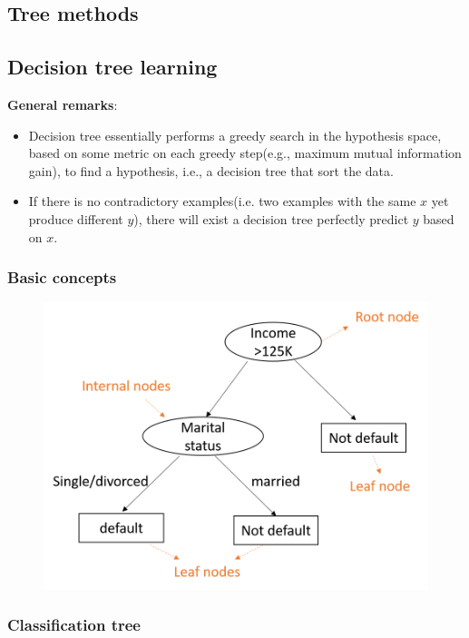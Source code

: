 \begin{refsection}
	\startcontents[chapters]	
	\chapter{Tree methods}


\section{Decision tree learning}

\begin{mdframed}
\textbf{General remarks}:
\begin{itemize}
	\item Decision tree essentially performs a greedy search in the hypothesis space, based on some metric on each greedy step(e.g., maximum mutual information gain), to find a hypothesis, i.e., a decision tree that sort the data.
	\item If there is no contradictory examples(i.e. two examples with the same $x$ yet produce different $y$), there will exist a decision tree perfectly predict $y$ based on $x$.
\end{itemize}
\end{mdframed}

\subsection{Basic concepts}

\begin{figure}[H]
	\centering
	\includegraphics[width=0.7\linewidth]{../figures/statisticalLearning/treeMethods/decisionTreeClassifierScheme}
	\caption{}
	\label{fig:decisiontreeclassifierscheme}
\end{figure}


\subsection{Classification tree}


\end{refsection}
